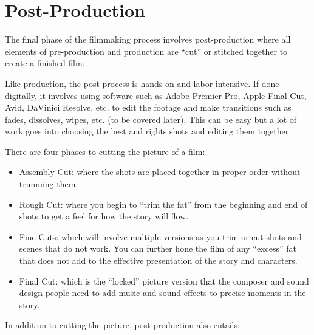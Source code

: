 \documentclass[
]{book}
\providecommand{\tightlist}{%
  \setlength{\itemsep}{0pt}\setlength{\parskip}{0pt}}
\begin{document}
\hypertarget{post-production}{%
\section{Post-Production}\label{post-production}}

The final phase of the filmmaking process involves post-production where all elements of pre-production and production are ``cut'' or stitched together to create a finished film.

Like production, the post process is hands-on and labor intensive. If done digitally, it involves using software such as Adobe Premier Pro, Apple Final Cut, Avid, DaVinici Resolve, etc. to edit the footage and make transitions such as fades, dissolves, wipes, etc. (to be covered later). This can be easy but a lot of work goes into choosing the best and rights shots and editing them together.

There are four phases to cutting the picture of a film:

\begin{itemize}
\tightlist
\item
  Assembly Cut: where the shots are placed together in proper order without trimming them.\\
\item
  Rough Cut: where you begin to ``trim the fat'' from the beginning and end of shots to get a feel for how the story will flow.\\
\item
  Fine Cuts: which will involve multiple versions as you trim or cut shots and scenes that do not work. You can further hone the film of any ``excess'' fat that does not add to the effective presentation of the story and characters.\\
\item
  Final Cut: which is the ``locked'' picture version that the composer and sound design people need to add music and sound effects to precise moments in the story.
\end{itemize}

In addition to cutting the picture, post-production also entails:
\end{document}
